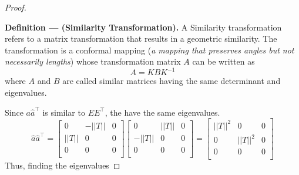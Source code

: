 \documentclass{article}
\begin{document}
\begin{proof}
\begin{tcolorbox}[enhanced,breakable, sharp corners, colback=purple!5!white, colframe=purple!55!black, boxrule=0mm,top=0mm,bottom=0mm,leftrule=1mm,drop shadow=black!40!white]
    {\color{purple!55!black} \textbf{Definition --- (Similarity Transformation).}} A Similarity transformation refers to a matrix transformation that results in a geometric similarity. The transformation is a conformal mapping (\textit{a mapping that preserves angles but not necessarily lengths}) whose transformation matrix $A$ can be written as
    $$A = KBK^{-1}$$
    where $A$ and $B$ are called similar matrices having the same determinant and eigenvalues.
\end{tcolorbox}
Since ${a}\hat{a}^\top$ is similar to $EE^\top$, the have the same eigenvalues.
$$\hat{a}\hat{a}^\top =
\begin{bmatrix}
      0    &  -||T|| &  0\\
    ||T||  &    0    &  0 \\
      0    &    0    &  0 \\
\end{bmatrix}
\begin{bmatrix}
      0    &  ||T||  &  0\\
    -||T|| &    0    &  0 \\
      0    &    0    &  0 \\
\end{bmatrix}
= 
\begin{bmatrix}
     ||T||^2 &     0     &  0\\
      0      &   ||T||^2 &  0 \\
      0      &     0     &  0 \\
\end{bmatrix}
$$
Thus, finding the eigenvalues 


\end{proof}
\end{document}
